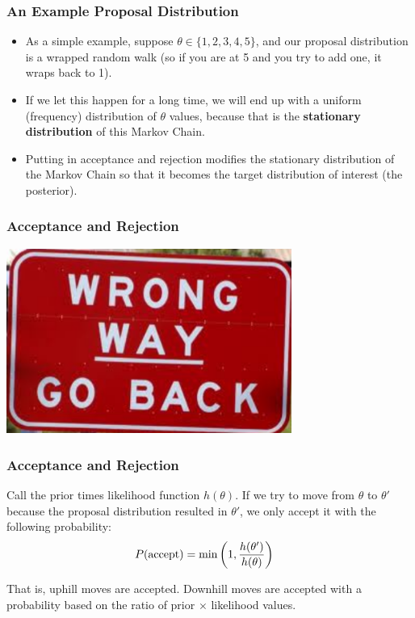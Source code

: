\documentclass{beamer}
\begin{document}
\begin{frame}
\frametitle{An Example Proposal Distribution}

\begin{itemize}
\item As a simple example, suppose $\theta \in \{1, 2, 3, 4, 5\}$, and our proposal
distribution is a wrapped random walk (so if you are at 5 and you try to add
one, it wraps back to 1).\pause
\item If we let this happen for a long time, we will end up with a uniform
(frequency) distribution of $\theta$ values, because that is the
{\bf stationary distribution} of this Markov Chain.\pause
\item Putting in acceptance and rejection modifies the stationary distribution
of the Markov Chain so that it becomes the target distribution of interest
(the posterior).
\end{itemize}

\end{frame}


\begin{frame}
\frametitle{Acceptance and Rejection}
\centering
\includegraphics[width=0.7\textwidth]{images/wrong_way.png}

\end{frame}

\begin{frame}
\frametitle{Acceptance and Rejection}
Call the prior times likelihood function $h(\theta)$.
If we try to move from $\theta$ to $\theta'$ because the proposal distribution
resulted in $\theta'$, we only accept it with the following probability:
\begin{align}
P(\textnormal{accept}) &= \min\left(1, \frac{h(\theta')}{h(\theta)}\right)
\end{align}
\pause

That is, uphill moves are accepted. Downhill moves are accepted with a probability
based on the ratio of prior $\times$ likelihood values.

\end{frame}
\end{document}
